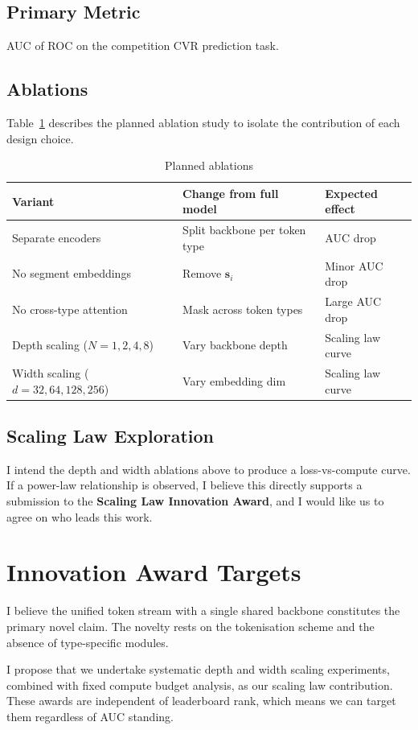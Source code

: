 \documentclass[10pt]{article}
\begin{document}
\subsection{Primary Metric}
AUC of ROC on the competition CVR prediction task.
\newpage
\subsection{Ablations}
Table~\ref{tab:ablations} describes the planned ablation study to isolate
the contribution of each design choice.

\begin{table}[h]
\centering
\caption{Planned ablations}
\label{tab:ablations}
\begin{tabular}{@{}lll@{}}
\toprule
Variant & Change from full model & Expected effect \\
\midrule
Separate encoders & Split backbone per token type & AUC drop \\
No segment embeddings & Remove $\mathbf{s}_i$ & Minor AUC drop \\
No cross-type attention & Mask across token types & Large AUC drop \\
Depth scaling ($N=1,2,4,8$) & Vary backbone depth & Scaling law curve \\
Width scaling ($d=32,64,128,256$) & Vary embedding dim & Scaling law curve \\
\bottomrule
\end{tabular}
\end{table}

\subsection{Scaling Law Exploration}
I intend the depth and width ablations above to produce a
loss-vs-compute curve. If a power-law relationship is observed, I
believe this directly supports a submission to the \textbf{Scaling Law
Innovation Award}, and I would like us to agree on who leads this work.

\section{Innovation Award Targets}

\begin{description}[noitemsep]
    \item[Unified Block Innovation Award (\$45,000)] I believe the
          unified token stream with a single shared backbone constitutes
          the primary novel claim. The novelty rests on the tokenisation
          scheme and the absence of type-specific modules.
    \item[Scaling Law Innovation Award (\$45,000)] I propose that we
          undertake systematic depth and width scaling experiments,
          combined with fixed compute budget analysis, as our scaling law
          contribution. These awards are independent of leaderboard rank,
          which means we can target them regardless of AUC standing.
\end{description}
\end{document}
